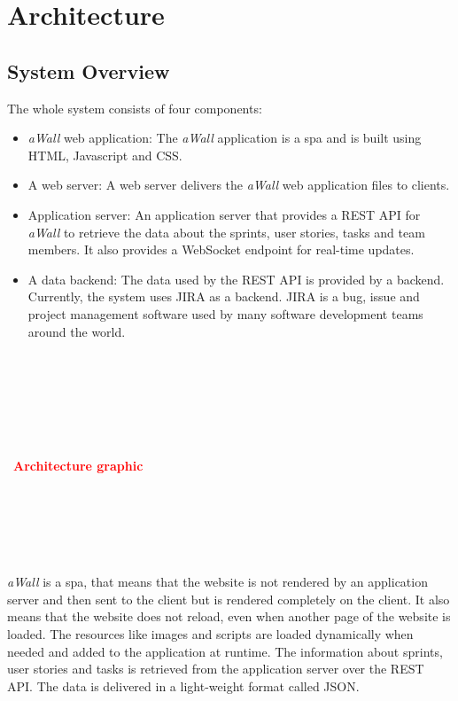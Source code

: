 \documentclass{sigchi}
\newcommand\todo[1]{~\\\\~\\~\\~\\~\\~\textbf{\huge{\textcolor{red}{#1}}}\\~\\~\\~\\~\\~}
\begin{document}
\section{Architecture}

\subsection{System Overview}

The whole system consists of four components:
\begin{itemize}
	\item \textit{aWall} web application: The \textit{aWall} application is a \gls{spa} and is built using HTML, Javascript and CSS.
	\item A web server: A web server delivers the \textit{aWall} web application files to clients.
	\item Application server: An application server that provides a REST API for \textit{aWall} to retrieve the data about the sprints, user stories, tasks and team members.
	It also provides a WebSocket endpoint for real-time updates.
	\item A data backend: The data used by the REST API is provided by a backend. 
	Currently, the system uses JIRA \cite{jira} as a backend. JIRA is a bug, issue and project management software used by many software development teams around the world.
\end{itemize}

\todo{Architecture graphic}

\textit{aWall} is a \gls{spa}, that means that the website is not rendered by an application server and then sent to the client but is rendered completely on the client.
It also means that the website does not reload, even when another page of the website is loaded. 
The resources like images and scripts are loaded dynamically when needed and added to the application at runtime.
The information about sprints, user stories and tasks is retrieved from the application server over the REST API.
The data is delivered in a light-weight format called JSON. 
\end{document}
